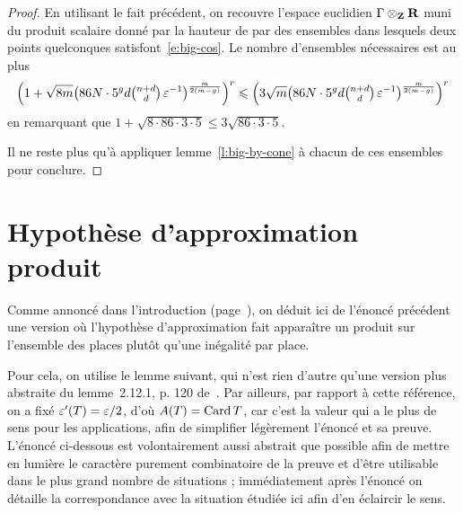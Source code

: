 \begin{proof}
  En utilisant le fait précédent, on recouvre l'espace euclidien \( \Gamma
    \otimes_{\mathbf{Z}} {\mathbf{R}} \) muni du produit scalaire donné par la hauteur de \NT par
  des ensembles dans lesquels deux points quelconques
  satisfont~\eqref{e:big-cos}. Le nombre d'ensembles nécessaires est au plus
  \begin{equation}
    \left(
      1 + \sqrt{8 m}
      \bigl(
        86 N \cdot 5^g d {\textstyle\binom{n + d}{d}}
        \, \varepsilon^{-1}
        \bigr)^{ \frac{m}{2(m-g)} }
    \right)^r
    \leqslant
    \left(
      3 \sqrt m
      \bigl(
        86 N \cdot 5^g d {\textstyle\binom{n + d}{d}}
        \, \varepsilon^{-1}
        \bigr)^{ \frac{m}{2(m-g)} }
    \right)^r
  \end{equation}
  en remarquant que \( 1 + \sqrt{ 8 \cdot 86 \cdot 3 \cdot 5 } \le 3 \sqrt{ 86
      \cdot 3 \cdot 5 } \).

  Il ne reste plus qu'à appliquer lemme~\vref{l:big-by-cone} à chacun de ces
  ensembles pour conclure.
\end{proof}



\section{Hypothèse d'approximation produit}
\label{sec:ha-prod}

Comme annoncé dans l'introduction (page~\pageref{e:ha-prod}), on déduit ici de
l'énoncé précédent une version où l'hypothèse d'approximation fait apparaître
un produit sur l'ensemble des places plutôt qu'une inégalité par place.

Pour cela, on utilise le lemme suivant, qui n'est rien d'autre qu'une version
plus abstraite du lemme~2.12.1, p. 120 de~\cite{farhith}. Par ailleurs, par
rapport à cette référence, on a fixé \( \varepsilon'(T) = \varepsilon/2 \), d'où \( A(T) =
  \operatorname{Card} T \), car c'est la valeur qui a le plus de sens pour les applications,
afin de simplifier légèrement l'énoncé et sa preuve. L'énoncé ci-dessous est
volontairement aussi abstrait que possible afin de mettre en lumière le
caractère purement combinatoire de la preuve et d'être utilisable dans le plus
grand nombre de situations ; immédiatement après l'énoncé on détaille la
correspondance avec la situation étudiée ici afin d'en éclaircir le sens.

